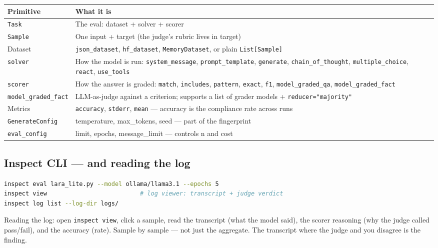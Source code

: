 \begin{center}
\begin{tabularx}{\linewidth}{lX}
\toprule
Primitive & What it is \\
\midrule
\texttt{Task} & The eval: dataset + solver + scorer \\
\texttt{Sample} & One input + target (the judge's rubric lives in target) \\
Dataset & \texttt{json\_dataset}, \texttt{hf\_dataset}, \texttt{MemoryDataset}, or plain \texttt{List[Sample]} \\
\texttt{solver} & How the model is run: \texttt{system\_message}, \texttt{prompt\_template}, \texttt{generate}, \texttt{chain\_of\_thought}, \texttt{multiple\_choice}, \texttt{react}, \texttt{use\_tools} \\
\texttt{scorer} & How the answer is graded: \texttt{match}, \texttt{includes}, \texttt{pattern}, \texttt{exact}, \texttt{f1}, \texttt{model\_graded\_qa}, \texttt{model\_graded\_fact} \\
\texttt{model\_graded\_fact} & LLM-as-judge against a criterion; supports a list of grader models + \texttt{reducer="majority"} \\
Metrics & \texttt{accuracy}, \texttt{stderr}, \texttt{mean} — accuracy is the compliance rate across runs \\
\texttt{GenerateConfig} & temperature, max\_tokens, seed — part of the fingerprint \\
\texttt{eval\_config} & limit, epochs, message\_limit — controls n and cost \\
\bottomrule
\end{tabularx}
\end{center}

\subsection{Inspect CLI — and reading the log}
\begin{lstlisting}[language=bash]
inspect eval lara_lite.py --model ollama/llama3.1 --epochs 5
inspect view                          # log viewer: transcript + judge verdict
inspect log list --log-dir logs/
\end{lstlisting}
Reading the log: open \texttt{inspect view}, click a sample, read the transcript (what the model said), the scorer reasoning (why the judge called pass/fail), and the accuracy (rate). Sample by sample — not just the aggregate. The transcript where the judge and you disagree is the finding.

